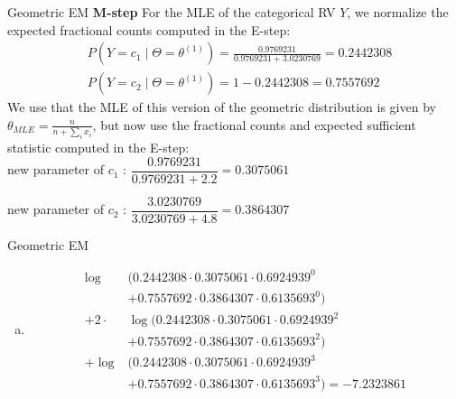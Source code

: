 \documentclass{beamer}\usepackage[]{graphicx}\usepackage[]{color}
\begin{document}
\begin{frame}{Geometric EM}
\textbf{M-step} For the MLE of the categorical RV $Y$, we normalize
the expected fractional counts computed in the E-step:
\begin{align*}
&P(Y=c_{1}\mid \Theta = \theta^{(1)}) = \frac{0.9769231}{0.9769231 + 3.0230769} = 0.2442308 \\
&P(Y=c_{2}\mid \Theta = \theta^{(1)}) = 1 - 0.2442308
= 0.7557692 
\end{align*}
We use that the MLE of this version of the geometric distribution is
given by $\theta_{MLE} = \frac{n}{n+\sum_i x_i}$, but now use the
fractional counts and expected sufficient statistic computed in the E-step:\\

new parameter of $ c_{1} $ : $ \dfrac{0.9769231}{
  0.9769231 + 2.2 } = 0.3075061 $\vspace{.5cm}

new parameter of $ c_{2} $ : $ \dfrac{3.0230769}{3.0230769 + 4.8} = 0.3864307 $
\end{frame}

\begin{frame}{Geometric EM}
 \begin{enumerate}[d)]
  The new log-likelihood of the data $x_1, x_2, x_3, x_4 = 0, 2, 2, 3$ is computed as in a) but now using the
  updated parameters $\theta^{(1)} = (\theta_{c_1}^{(1)}, \theta_{c_2}^{(1)},
  w_1^{(1)},w_2^{(1)}) = (0.3075061,
  0.3864307,0.2442308,0.7557692)$:
\item \begin{align*}
\log&(0.2442308\cdot 0.3075061\cdot 0.6924939^{0}  \\
&+ 0.7557692 \cdot 0.3864307 \cdot 0.6135693^{0}) \\
+ 2\cdot &\log(0.2442308\cdot 0.3075061 \cdot 0.6924939^{2} \\
&+ 0.7557692\cdot 0.3864307 \cdot 0.6135693^{2}) \\
+ \log&(0.2442308\cdot 0.3075061 \cdot 0.6924939^{3} \\
&+ 0.7557692\cdot 0.3864307 \cdot 0.6135693^{3})
= \ensuremath{-7.2323861} 
\end{align*}
\end{enumerate}
\end{frame}
\end{document}
